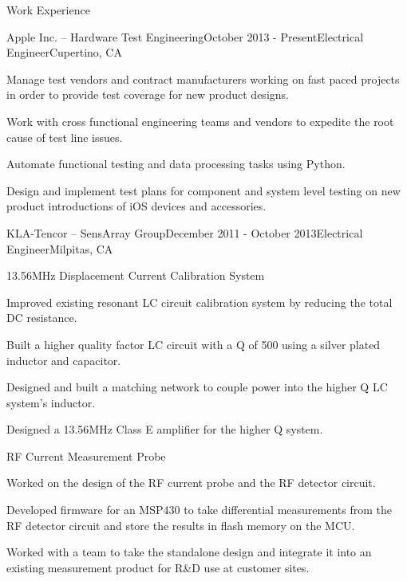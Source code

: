 \documentclass{resume} %
\begin{document}
\pagebreak[3]
\begin{rSection}{Work Experience}
\begin{rSubsection}{Apple Inc. -- Hardware Test Engineering}{October 2013 - Present}{Electrical Engineer}{Cupertino, CA}
\item Manage test vendors and contract manufacturers working on fast paced projects in order to provide test coverage for new product designs.
\item Work with cross functional engineering teams and vendors to expedite the root cause of test line issues.
\item Automate functional testing and data processing tasks using Python.
\item Design and implement test plans for component and system level testing on new product introductions of iOS devices and accessories.
\end{rSubsection}


\begin{rSubsection2}{KLA-Tencor -- SensArray Group}{December 2011 - October 2013}{Electrical Engineer}{Milpitas, CA}

\pagebreak[2]
\begin{rWorkProject}{13.56MHz Displacement Current Calibration System}
\item Improved existing resonant LC circuit calibration system by reducing the total DC resistance.
\item Built a higher quality factor LC circuit with a Q of 500 using a silver plated inductor and capacitor.
\item Designed and built a matching network to couple power into the higher Q LC system's inductor.
\item Designed a 13.56MHz Class E amplifier for the higher Q system.
\end{rWorkProject}

\pagebreak[2]
\begin{rWorkProject}{RF Current Measurement Probe}
\item Worked on the design of the RF current probe and the RF detector circuit.
\item Developed firmware for an MSP430 to take differential measurements from the RF detector circuit and store the results in flash memory on the MCU.
\item Worked with a team to take the standalone design and integrate it into an existing measurement product for R\&D use at customer sites.
\end{rWorkProject}


\end{rSubsection2}
\end{rSection}
\end{document}
